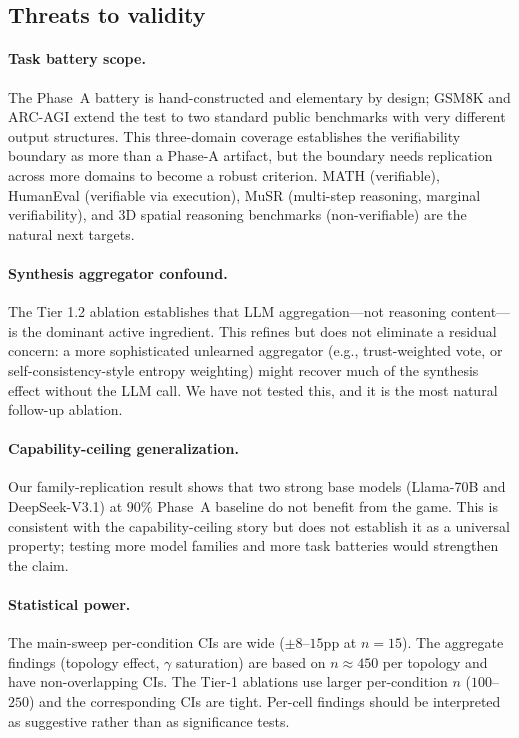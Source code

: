 \documentclass[11pt]{amsart}
\newcommand{\g}{\gamma}
\newcommand\1{{\mathds{1}}}
\theoremstyle{definition}
\theoremstyle{remark}
\numberwithin{equation}{section}
\begin{document}
\subsection{Threats to validity}\label{sec:threats}

\paragraph{Task battery scope.}
The Phase~A battery is hand-constructed and elementary by design; GSM8K and ARC-AGI extend the test to two standard public benchmarks with very different output structures.
This three-domain coverage establishes the verifiability boundary as more than a Phase-A artifact, but the boundary needs replication across more domains to become a robust criterion.
MATH \cite{Hendrycks2021MATH} (verifiable), HumanEval \cite{Chen2021HumanEval} (verifiable via execution), MuSR \cite{Sprague2024MuSR} (multi-step reasoning, marginal verifiability), and 3D spatial reasoning benchmarks (non-verifiable) are the natural next targets.

\paragraph{Synthesis aggregator confound.}
The Tier 1.2 ablation establishes that LLM aggregation---not reasoning content---is the dominant active ingredient.
This refines but does not eliminate a residual concern: a more sophisticated unlearned aggregator (e.g., trust-weighted vote, or self-consistency-style entropy weighting) might recover much of the synthesis effect without the LLM call.
We have not tested this, and it is the most natural follow-up ablation.

\paragraph{Capability-ceiling generalization.}
Our family-replication result shows that two strong base models (Llama-70B and DeepSeek-V3.1) at $90\%$ Phase~A baseline do not benefit from the game.
This is consistent with the capability-ceiling story but does not establish it as a universal property; testing more model families and more task batteries would strengthen the claim.

\paragraph{Statistical power.}
The main-sweep per-condition CIs are wide ($\pm 8$--$15$pp at $n = 15$).
The aggregate findings (topology effect, $\g$ saturation) are based on $n \approx 450$ per topology and have non-overlapping CIs.
The Tier-1 ablations use larger per-condition $n$ ($100$--$250$) and the corresponding CIs are tight.
Per-cell findings should be interpreted as suggestive rather than as significance tests.
\end{document}
